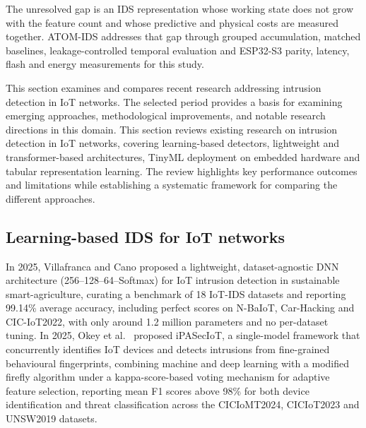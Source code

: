 \documentclass[10pt,letterpaper,twocolumn]{article}
\begin{document}
The unresolved gap is an IDS representation whose working state does not grow
with the feature count and whose predictive and physical costs are measured
together. ATOM-IDS addresses that gap through grouped accumulation, matched
baselines, leakage-controlled temporal evaluation and ESP32-S3 parity,
latency, flash and energy measurements for this study.

\iffalse

This section examines and compares recent research addressing intrusion detection in IoT networks. The selected period provides a basis for examining emerging approaches, methodological improvements, and notable research directions in this domain. This section reviews existing research on intrusion detection in IoT networks, covering learning-based detectors, lightweight and transformer-based architectures, TinyML deployment on embedded hardware and tabular representation learning. The review highlights key performance outcomes and limitations while establishing a systematic framework for comparing the different approaches.

\subsection{Learning-based IDS for IoT networks}
\label{sec:related:learning}

In 2025, Villafranca and Cano \cite{villafranca2025edgedl} proposed a
lightweight, dataset-agnostic DNN architecture (256--128--64--Softmax) for IoT
intrusion detection in sustainable smart-agriculture, curating a benchmark of
18 IoT-IDS datasets and reporting 99.14\% average accuracy, including perfect
scores on N-BaIoT, Car-Hacking and CIC-IoT2022, with only around 1.2 million
parameters and no per-dataset tuning. In 2025, Okey et al.\
\cite{okey2025ipasecoit} proposed iPASecIoT, a single-model framework that
concurrently identifies IoT devices and detects intrusions from fine-grained
behavioural fingerprints, combining machine and deep learning with a modified
firefly algorithm under a kappa-score-based voting mechanism for adaptive
feature selection, reporting mean F1 scores above 98\% for both device
identification and threat classification across the CICIoMT2024, CICIoT2023
and UNSW2019 datasets.
\end{document}
